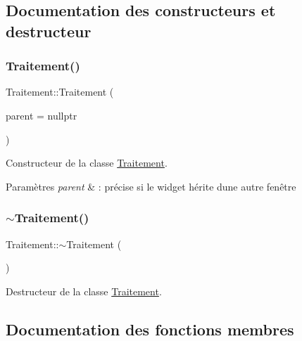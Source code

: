 \subsection{Documentation des constructeurs et destructeur}
\mbox{\label{classTraitement_a36edd9e6ce6e72cfef7f9c857c3c9cf2}} 
\subsubsection{\texorpdfstring{Traitement()}{Traitement()}}
{\footnotesize\ttfamily Traitement\+::\+Traitement (\begin{DoxyParamCaption}\item[{Q\+Object $\ast$}]{parent = {\ttfamily nullptr} }\end{DoxyParamCaption})\hspace{0.3cm}{\ttfamily [explicit]}}



Constructeur de la classe \hyperlink{classTraitement}{Traitement}. 


\begin{DoxyParams}{Paramètres}
{\em parent} & \+: précise si le widget hérite d\textquotesingle{}une autre fenêtre \\
\hline
\end{DoxyParams}
\mbox{\label{classTraitement_a7dd82f97c992d07b7032184f12c7fab9}} 
\subsubsection{\texorpdfstring{$\sim$\+Traitement()}{~Traitement()}}
{\footnotesize\ttfamily Traitement\+::$\sim$\+Traitement (\begin{DoxyParamCaption}{ }\end{DoxyParamCaption})}



Destructeur de la classe \hyperlink{classTraitement}{Traitement}. 



\subsection{Documentation des fonctions membres}
\mbox{\label{classTraitement_afde7a0c290d7bc8204db5bf40d060a2e}} 
